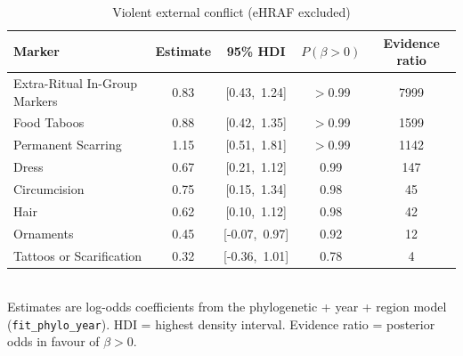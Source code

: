 \begin{table}[ht]
\centering
\caption{Violent external conflict (eHRAF excluded)}
\begin{tabular}{lcccc}
\toprule
Marker & Estimate & 95\% HDI & $P(\beta > 0)$ & Evidence ratio \\
\midrule
Extra-Ritual In-Group Markers & 0.83 & [0.43,\ 1.24] & $>$0.99 & 7999 \\
Food Taboos & 0.88 & [0.42,\ 1.35] & $>$0.99 & 1599 \\
Permanent Scarring & 1.15 & [0.51,\ 1.81] & $>$0.99 & 1142 \\
Dress & 0.67 & [0.21,\ 1.12] & 0.99 & 147 \\
Circumcision & 0.75 & [0.15,\ 1.34] & 0.98 & 45 \\
Hair & 0.62 & [0.10,\ 1.12] & 0.98 & 42 \\
Ornaments & 0.45 & [-0.07,\ 0.97] & 0.92 & 12 \\
Tattoos or Scarification & 0.32 & [-0.36,\ 1.01] & 0.78 & 4 \\
\bottomrule
\end{tabular}
\\[4pt]\small Estimates are log-odds coefficients from the phylogenetic + year + region model (\texttt{fit\_phylo\_year}). HDI = highest density interval. Evidence ratio = posterior odds in favour of $\beta > 0$.
\end{table}